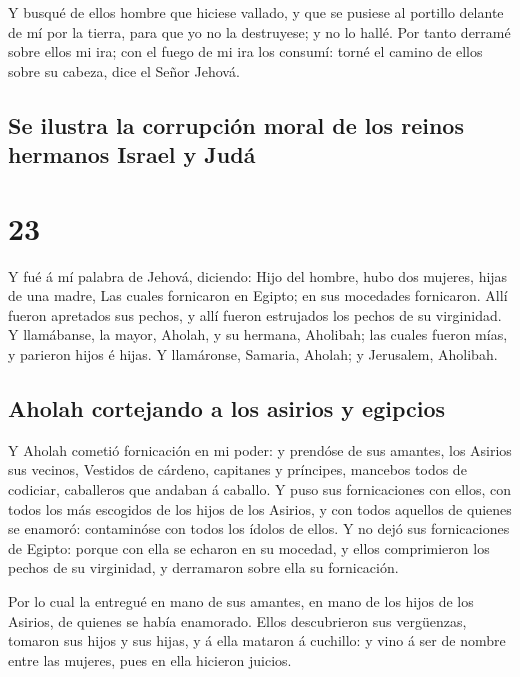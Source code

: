  Y busqué de ellos hombre que hiciese vallado, y que se
pusiese al portillo delante de mí por la tierra, para que yo no la
destruyese; y no lo hallé.  Por tanto derramé sobre ellos
mi ira; con el fuego de mi ira los consumí: torné el camino de ellos
sobre su cabeza, dice el Señor Jehová.

\hypertarget{se-ilustra-la-corrupciuxf3n-moral-de-los-reinos-hermanos-israel-y-juduxe1}{%
\subsection{Se ilustra la corrupción moral de los reinos hermanos Israel
y
Judá}\label{se-ilustra-la-corrupciuxf3n-moral-de-los-reinos-hermanos-israel-y-juduxe1}}

\hypertarget{section-22}{%
\section{23}\label{section-22}}

 Y fué á mí palabra de Jehová, diciendo: 
Hijo del hombre, hubo dos mujeres, hijas de una madre, 
Las cuales fornicaron en Egipto; en sus mocedades fornicaron. Allí
fueron apretados sus pechos, y allí fueron estrujados los pechos de su
virginidad.  Y llamábanse, la mayor, Aholah, y su hermana,
Aholibah; las cuales fueron mías, y parieron hijos é hijas. Y
llamáronse, Samaria, Aholah; y Jerusalem, Aholibah.

\hypertarget{aholah-cortejando-a-los-asirios-y-egipcios}{%
\subsection{Aholah cortejando a los asirios y
egipcios}\label{aholah-cortejando-a-los-asirios-y-egipcios}}

 Y Aholah cometió fornicación en mi poder: y prendóse de
sus amantes, los Asirios sus vecinos,  Vestidos de
cárdeno, capitanes y príncipes, mancebos todos de codiciar, caballeros
que andaban á caballo.  Y puso sus fornicaciones con
ellos, con todos los más escogidos de los hijos de los Asirios, y con
todos aquellos de quienes se enamoró: contaminóse con todos los ídolos
de ellos.  Y no dejó sus fornicaciones de Egipto: porque
con ella se echaron en su mocedad, y ellos comprimieron los pechos de su
virginidad, y derramaron sobre ella su fornicación.

 Por lo cual la entregué en mano de sus amantes, en mano
de los hijos de los Asirios, de quienes se había enamorado.
 Ellos descubrieron sus vergüenzas, tomaron sus hijos y
sus hijas, y á ella mataron á cuchillo: y vino á ser de nombre entre las
mujeres, pues en ella hicieron juicios.

